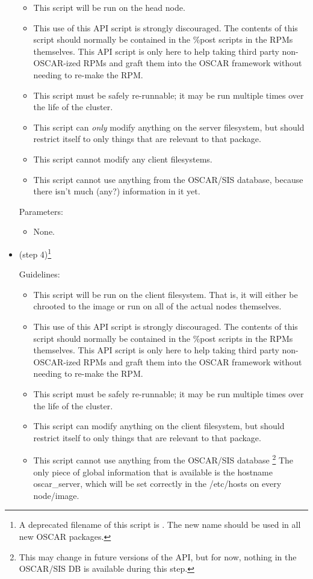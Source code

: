 \begin{itemize}
  \begin{itemize}
  \item This script will be run on the head node.
  \item This use of this API script is strongly discouraged.  The
    contents of this script should normally be contained in the \%post
    scripts in the RPMs themselves.  This API script is only here to
    help taking third party non-OSCAR-ized RPMs and graft them into
    the OSCAR framework without needing to re-make the RPM.
  \item This script must be safely re-runnable; it may be run multiple
    times over the life of the cluster.
  \item This script can {\em only} modify anything on the server
    filesystem, but should restrict itself to only things that are
    relevant to that package.
  \item This script cannot modify any client filesystems.
  \item This script cannot use anything from the OSCAR/SIS database,
    because there isn't much (any?) information in it yet.
  \end{itemize}

  Parameters:
  
  \begin{itemize}
  \item None.
  \end{itemize}
  
\item {} (step 4)\footnote{A deprecated
    filename of this script is .  The new
    name  should be used in all new
    OSCAR packages.}  
  
  Guidelines:

  \begin{itemize}
  \item This script will be run on the client filesystem.  That is, it
    will either be chrooted to the image or run on all of the actual
    nodes themselves.
  \item This use of this API script is strongly discouraged.  The
    contents of this script should normally be contained in the \%post
    scripts in the RPMs themselves.  This API script is only here to
    help taking third party non-OSCAR-ized RPMs and graft them into
    the OSCAR framework without needing to re-make the RPM.
  \item This script must be safely re-runnable; it may be run multiple
    times over the life of the cluster.
  \item This script can modify anything on the client filesystem, but
    should restrict itself to only things that are relevant to that
    package.
  \item This script cannot use anything from the OSCAR/SIS database
    \footnote{This may change in future versions of the API, but for
      now, nothing in the OSCAR/SIS DB is available during this step.}
    The only piece of global information that is available is the
    hostname oscar\_server, which will be set correctly in the
    /etc/hosts on every node/image.
  \end{itemize}


\end{itemize}
